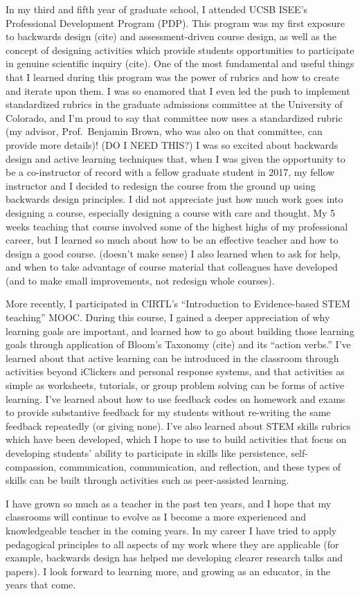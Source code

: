 \documentclass[11pt]{article}
\begin{document}
In my third and fifth year of graduate school, I attended UCSB ISEE’s Professional Development Program (PDP). 
This program was my first exposure to backwards design (cite) and assessment-driven course design, as well as the concept of designing activities which provide students opportunities to participate in genuine scientific inquiry (cite). 
One of the most fundamental and useful things that I learned during this program was the power of rubrics and how to create and iterate upon them. 
I was so enamored that I even led the push to implement standardized rubrics in the graduate admissions committee at the University of Colorado, and I’m proud to say that committee now uses a standardized rubric (my advisor, Prof.~Benjamin Brown, who was also on that committee, can provide more details)! (DO I NEED THIS?)
I was so excited about backwards design and active learning techniques that, when I was given the opportunity to be a co-instructor of record with a fellow graduate student in 2017, my fellow instructor and I decided to redesign the course from the ground up using backwards design principles. 
I did not appreciate just how much work goes into designing a course, especially designing a course with care and thought. 
My 5 weeks teaching that course involved some of the highest highs of my professional career, but I learned so much about how to be an effective teacher and how to design a good course.  (doesn't make sense)
I also learned when to ask for help, and when to take advantage of course material that colleagues have developed (and to make small improvements, not redesign whole courses).

More recently, I participated in CIRTL's ``Introduction to Evidence-based STEM teaching'' MOOC.
During this course, I gained a deeper appreciation of why learning goals are important, and learned how to go about building those learning goals through application of Bloom's Taxonomy (cite) and its ``action verbs.''
I've learned about that active learning can be introduced in the classroom through activities beyond iClickers and personal response systems, and that activities as simple as worksheets, tutorials, or group problem solving can be forms of active learning.
I've learned about how to use feedback codes on homework and exams to provide substantive feedback for my students without re-writing the same feedback repeatedly (or giving none).
I've also learned about STEM skills rubrics which have been developed, which I hope to use to build activities that focus on developing students' ability to participate in skills like persistence, self-compassion, communication, communication, and reflection, and these types of skills can be built through activities such as peer-assisted learning.

I have grown so much as a teacher in the past ten years, and I hope that my classrooms will continue to evolve as I become a more experienced and knowledgeable teacher in the coming years.
In my career I have tried to apply pedagogical principles to all aspects of my work where they are applicable (for example, backwards design has helped me developing clearer research talks and papers). 
I look forward to learning more, and growing as an educator, in the years that come.


{\scriptsize

}
\end{document}
